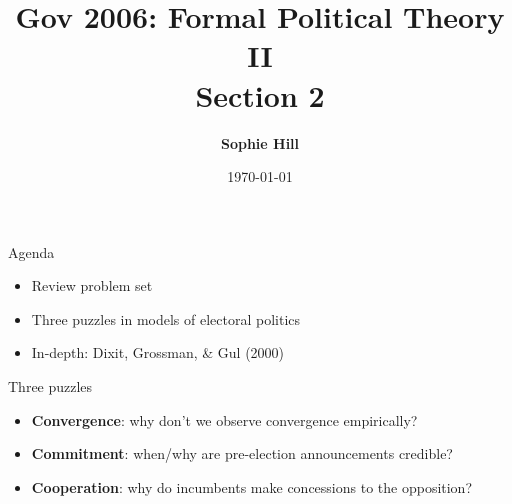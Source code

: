 \documentclass[aspectratio=169]{beamer}
\title{Gov 2006: Formal Political Theory II \\
Section 2}
\date{\today}
\author{ \textbf{Sophie Hill}}
\begin{document}
  \maketitle
  

\begin{frame}{Agenda}

\Large

\begin{itemize}
\setlength{\itemsep}{1.5em}

\item Review problem set

\item Three puzzles in models of electoral politics

\item In-depth: Dixit, Grossman, \& Gul (2000)
\end{itemize}

\end{frame}
\begin{frame}{Three puzzles}

\Large
\pause 
\begin{itemize}
\setlength{\itemsep}{1.5em}
\item \textbf{\alert{Convergence}}: why don't we observe convergence empirically?

\pause 
\item \textbf{\alert{Commitment}}: when/why are pre-election announcements credible?

\pause 
\item \textbf{\alert{Cooperation}}: why do incumbents make concessions to the opposition?

\end{itemize}

\end{frame}
\end{document}

